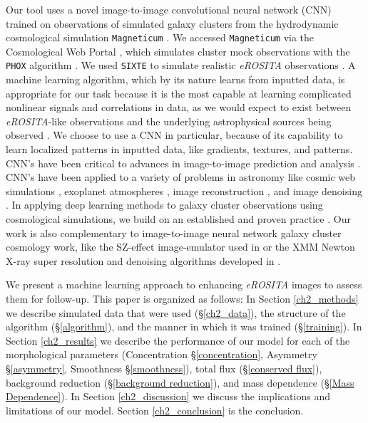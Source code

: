 Our tool uses a novel image-to-image convolutional neural network (CNN) trained on observations of simulated galaxy clusters from the hydrodynamic cosmological simulation \texttt{Magneticum} \cite{magneticum}. We accessed \texttt{Magneticum} via the Cosmological Web Portal \cite{cosmo_web_portal}, which simulates cluster mock observations with the \texttt{PHOX} algorithm \cite{PHOX1,PHOX2}. We used \texttt{SIXTE} to simulate realistic \textit{eROSITA} observations \cite{SIXTE}. A machine learning algorithm, which by its nature learns from inputted data, is appropriate for our task because it is the most capable at learning complicated nonlinear signals and correlations in data, as we would expect to exist between \textit{eROSITA}-like observations and the underlying astrophysical sources being observed \cite[see][for a review of deep learning]{Schmidhuber_2014}. We choose to use a CNN in particular, because of its capability to learn localized patterns in inputted data, like gradients, textures, and patterns. CNN's have been critical to advances in image-to-image prediction and analysis \cite[e.g.,][]{UNET,ploss}. CNN's have been applied to a variety of problems in astronomy like cosmic web simulations \cite{Rodriguez_2018}, exoplanet atmospheres \cite{Zingales_2018}, image reconstruction \cite{Flamary_2016}, and image denoising \cite{Vojtekova_2021}. In applying deep learning methods to galaxy cluster observations using cosmological simulations, we build on an established and proven practice \cite[see e.g.,][]{Ntampaka_2015,Green_2019,Ntampaka_2019}. Our work is also complementary to image-to-image neural network galaxy cluster cosmology work, like the SZ-effect image-emulator used in \cite{Rothschild_2022} or the XMM Newton X-ray super resolution and denoising algorithms developed in \cite{Sweere_2022}.

We present a machine learning approach to enhancing \textit{eROSITA} images to assess them for follow-up. This paper is organized as follows: In Section \ref{ch2_methods} we describe simulated data that were used (\S\ref{ch2_data}), the structure of the algorithm (\S\ref{algorithm}), and the manner in which it was trained (\S\ref{training}). In Section \ref{ch2_results} we describe the performance of our model for each of the morphological parameters (Concentration \S\ref{concentration}, Asymmetry \S\ref{asymmetry}, Smoothness \S\ref{smoothness}), total flux (\S\ref{conserved flux}), background reduction (\S\ref{background reduction}), and mass dependence (\S\ref{Mass Dependence}). In Section \ref{ch2_discussion} we discuss the implications and limitations of our model. Section \ref{ch2_conclusion} is the conclusion.


